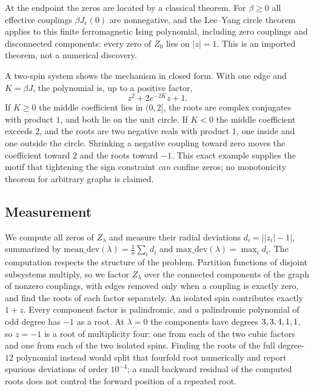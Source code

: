 At the endpoint the zeros are located by a classical theorem.
For $\beta\ge 0$ all effective couplings $\beta J_e(0)$ are nonnegative, and the Lee--Yang circle theorem \cite{LeeYang1952} applies to this finite ferromagnetic Ising polynomial, including zero couplings and disconnected components: every zero of $Z_0$ lies on $|z|=1$.
This is an imported theorem, not a numerical discovery.

A two-spin system shows the mechanism in closed form.
With one edge and $K=\beta J$, the polynomial is, up to a positive factor,
\[
  z^2+2e^{-2K}z+1 .
\]
If $K\ge 0$ the middle coefficient lies in $(0,2]$, the roots are complex conjugates with product $1$, and both lie on the unit circle.
If $K<0$ the middle coefficient exceeds $2$, and the roots are two negative reals with product $1$, one inside and one outside the circle.
Shrinking a negative coupling toward zero moves the coefficient toward $2$ and the roots toward $-1$.
This exact example supplies the motif that tightening the sign constraint \emph{can} confine zeros; no monotonicity theorem for arbitrary graphs is claimed.

\subsection{Measurement}
We compute all zeros of $Z_\lambda$ and measure their radial deviations $d_i=\bigl||z_i|-1\bigr|$, summarized by $\mathrm{mean\_dev}(\lambda)=\frac1n\sum_id_i$ and $\mathrm{max\_dev}(\lambda)=\max_id_i$.
The computation respects the structure of the problem.
Partition functions of disjoint subsystems multiply, so we factor $Z_\lambda$ over the connected components of the graph of nonzero couplings, with edges removed only when a coupling is exactly zero, and find the roots of each factor separately.
An isolated spin contributes exactly $1+z$.
Every component factor is palindromic, and a palindromic polynomial of odd degree has $-1$ as a root.
At $\lambda=0$ the components have degrees $3,3,4,1,1$, so $z=-1$ is a root of multiplicity four: one from each of the two cubic factors and one from each of the two isolated spins.
Finding the roots of the full degree-$12$ polynomial instead would split that fourfold root numerically and report spurious deviations of order $10^{-4}$; a small backward residual of the computed roots does not control the forward position of a repeated root.

